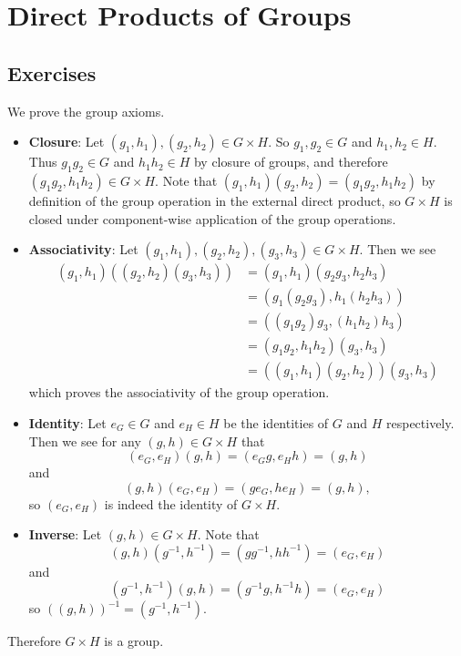 \section{Direct Products of Groups}
\subsection*{Exercises}
\begin{questions}
    \item We prove the group axioms.
    \begin{itemize}
        \item \textbf{Closure}: Let $(g_1, h_1), (g_2, h_2) \in G \times H$. So $g_1, g_2 \in G$ and $h_1, h_2 \in H$. Thus $g_1g_2 \in G$ and $h_1h_2 \in H$ by closure of groups, and therefore $(g_1g_2, h_1h_2) \in G\times H$. Note that $(g_1, h_1)(g_2, h_2) = (g_1g_2, h_1h_2)$ by definition of the group operation in the external direct product, so $G \times H$ is closed under component-wise application of the group operations.

        \item \textbf{Associativity}: Let $(g_1, h_1), (g_2, h_2), (g_3, h_3) \in G \times H$. Then we see
        \begin{align*}
            (g_1, h_1)\left((g_2, h_2)(g_3, h_3)\right) &= (g_1, h_1)(g_2g_3, h_2h_3)\\
            &= (g_1(g_2g_3), h_1(h_2h_3))\\
            &= ((g_1g_2)g_3, (h_1h_2)h_3)\\
            &= (g_1g_2, h_1h_2)(g_3,h_3)\\
            &= \left((g_1,h_1)(g_2,h_2)\right)(g_3,h_3)
        \end{align*}
        which proves the associativity of the group operation.

        \item \textbf{Identity}: Let $e_G \in G$ and $e_H \in H$ be the identities of $G$ and $H$ respectively. Then we see for any $(g, h) \in G \times H$ that
        \[
            (e_G, e_H)(g, h) = (e_Gg, e_Hh) = (g, h)
        \]
        and
        \[
            (g, h)(e_G, e_H) = (ge_G, he_H) = (g, h),
        \]
        so $(e_G, e_H)$ is indeed the identity of $G \times H$.

        \item \textbf{Inverse}: Let $(g, h) \in G \times H$. Note that
        \[
            (g, h)(g^{-1}, h^{-1}) = (gg^{-1}, hh^{-1}) = (e_G, e_H)
        \]
        and
        \[
            (g^{-1}, h^{-1})(g, h) = (g^{-1}g, h^{-1}h) = (e_G, e_H)
        \]
        so $\left((g, h)\right)^{-1} = (g^{-1}, h^{-1})$.
    \end{itemize}
    Therefore $G \times H$ is a group.


\end{questions}
